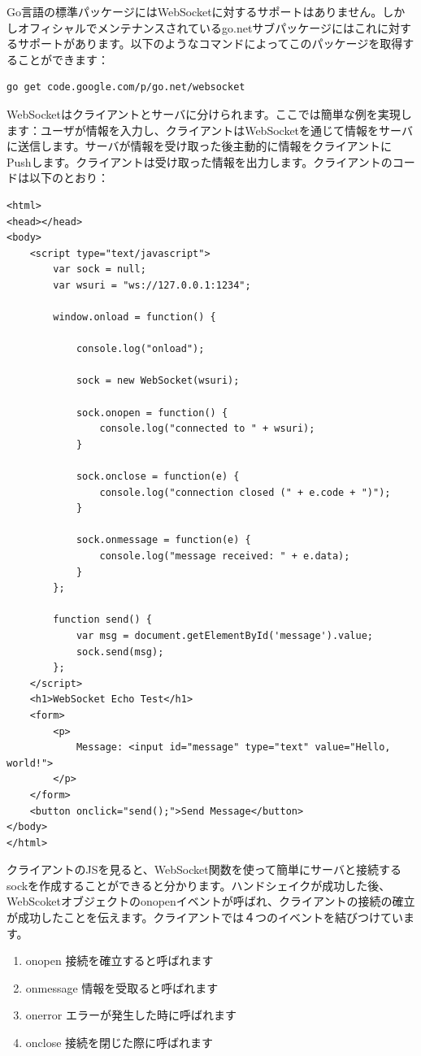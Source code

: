 Go言語の標準パッケージにはWebSocketに対するサポートはありません。しかしオフィシャルでメンテナンスされているgo.netサブパッケージにはこれに対するサポートがあります。以下のようなコマンドによってこのパッケージを取得することができます：


\begin{lstlisting}[numbers=none]
go get code.google.com/p/go.net/websocket
\end{lstlisting}

WebSocketはクライアントとサーバに分けられます。ここでは簡単な例を実現します：ユーザが情報を入力し、クライアントはWebSocketを通じて情報をサーバに送信します。サーバが情報を受け取った後主動的に情報をクライアントにPushします。クライアントは受け取った情報を出力します。クライアントのコードは以下のとおり：

\begin{lstlisting}[numbers=none]
<html>
<head></head>
<body>
    <script type="text/javascript">
        var sock = null;
        var wsuri = "ws://127.0.0.1:1234";

        window.onload = function() {

            console.log("onload");

            sock = new WebSocket(wsuri);

            sock.onopen = function() {
                console.log("connected to " + wsuri);
            }

            sock.onclose = function(e) {
                console.log("connection closed (" + e.code + ")");
            }

            sock.onmessage = function(e) {
                console.log("message received: " + e.data);
            }
        };

        function send() {
            var msg = document.getElementById('message').value;
            sock.send(msg);
        };
    </script>
    <h1>WebSocket Echo Test</h1>
    <form>
        <p>
            Message: <input id="message" type="text" value="Hello, world!">
        </p>
    </form>
    <button onclick="send();">Send Message</button>
</body>
</html>
\end{lstlisting}

クライアントのJSを見ると、WebSocket関数を使って簡単にサーバと接続するsockを作成することができると分かります。ハンドシェイクが成功した後、WebScoketオブジェクトのonopenイベントが呼ばれ、クライアントの接続の確立が成功したことを伝えます。クライアントでは４つのイベントを結びつけています。

\begin{enumerate}
  \item onopen 接続を確立すると呼ばれます
  \item onmessage 情報を受取ると呼ばれます
  \item onerror エラーが発生した時に呼ばれます
  \item onclose 接続を閉じた際に呼ばれます
\end{enumerate}

